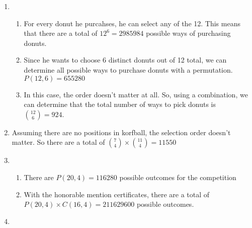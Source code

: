 \documentclass[12pt]{article}
\newcommand{\s}[1]{\setcounter{enumi}{#1}}
\begin{document}
\begin{enumerate}
  \item 
    \begin{enumerate}
      \item For every donut he purcahses, he can select any of the 12. This means that there are a total of $12^6 = 2985984$ possible ways of purchasing donuts.
      \item Since he wants to choose 6 distinct donuts out of 12 total, we can determine all possible ways to purchase donuts with a permutation. $P(12, 6) = 655280$
      \item In this case, the order doesn't matter at all. So, using a combination, we can determine that the total number of ways to pick donuts is $\binom{12}{6} = 924$.
    \end{enumerate}
  \item Assuming there are no positions in korfball, the selection order doesn't matter. So there are a total of $\binom{7}{4} \times \binom{11}{4} = 11550$
  \item
    \begin{enumerate}
      \item There are $P(20,4) = 116280$ possible outcomes for the competition
      \item With the honorable mention certificates, there are a total of $P(20,4) \times C(16,4) = 211629600$ possible outcomes.
    \end{enumerate}

  \s{14}
  
  \item
\end{enumerate}
\end{document}
